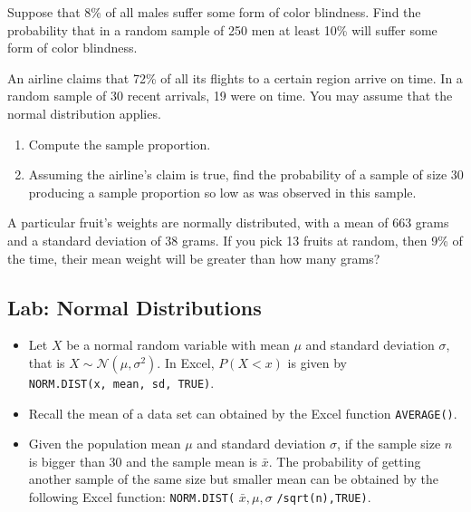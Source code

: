 \begin{exercise}

Suppose that 8\% of all males suffer some form of color blindness. Find
the probability that in a random sample of 250 men at least 10\% will
suffer some form of color blindness.
  
\end{exercise}

\vspace*{6\baselineskip}

\begin{exercise}

An airline claims that 72\% of all its flights to a certain region
arrive on time. In a random sample of 30 recent arrivals, 19 were on
time. You may assume that the normal distribution applies.

\begin{enumerate}
\item
  Compute the sample proportion.
\item
  Assuming the airline's claim is true, find the probability of a sample
  of size 30 producing a sample proportion so low as was observed in
  this sample.
\end{enumerate}

\end{exercise}

\begin{exercise}

A particular fruit's weights are normally distributed, with a mean of
663 grams and a standard deviation of 38 grams.
If you pick 13 fruits at random, then 9\% of the time, their mean weight
will be greater than how many grams?

\end{exercise}

\vspace*{2.5\baselineskip}

\subsection{Lab: Normal Distributions}

\begin{itemize}
\item
  Let \(X\) be a normal random variable with mean \(\mu\) and standard
  deviation \(\sigma\), that is \(X\sim \mathcal{N}(\mu, \sigma^2)\). In
  Excel, \(P(X<x)\) is given by
  \texttt{NORM.DIST(x,\ mean,\ sd,\ TRUE)}.
\item
  Recall the mean of a data set can obtained by the Excel function
  \texttt{AVERAGE()}.
\item
  Given the population mean \(\mu\) and standard deviation \(\sigma\),
  if the sample size \(n\) is bigger than 30 and the sample mean is
  \(\bar{x}\). The probability of getting another sample of the same
  size but smaller mean can be obtained by the following Excel function:
  \texttt{NORM.DIST(} \(\bar{x},\mu,\sigma\) \texttt{/sqrt(n),TRUE)}.
\end{itemize}

